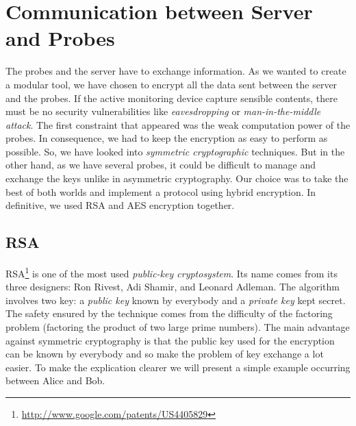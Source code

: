 \section{Communication between Server and Probes}
The probes and the server have to exchange information. As we wanted to create a modular tool, we have chosen to encrypt all the data sent between the server and the probes. If the active monitoring device capture sensible contents, there must be no security vulnerabilities like \emph{eavesdropping} or \emph{man-in-the-middle attack}.
The first constraint that appeared was the weak computation power of the probes. In consequence, we had to keep the encryption as easy to perform as possible. So, we have looked into \emph{symmetric cryptographic} techniques. But in the other hand, as we have several probes, it could be difficult to manage and exchange the keys unlike in asymmetric cryptography. Our choice was to take the best of both worlds and implement a protocol using hybrid encryption.
In definitive, we used RSA and AES encryption together.

\subsection{RSA}
RSA\footnote{\url{http://www.google.com/patents/US4405829}} is one of the most used \emph{public-key cryptosystem}. Its name comes from its three designers: Ron Rivest, Adi Shamir, and Leonard Adleman. The algorithm involves two key: a \emph{public key} known by everybody and a \emph{private key} kept secret. The safety ensured by the technique comes from the difficulty of the factoring problem (factoring the product of two large prime numbers).
The main advantage against symmetric cryptography is that the public key used for the encryption can be known by everybody and so make the problem of key exchange a lot easier. To make the explication clearer we will present a simple example occurring between Alice and Bob.

